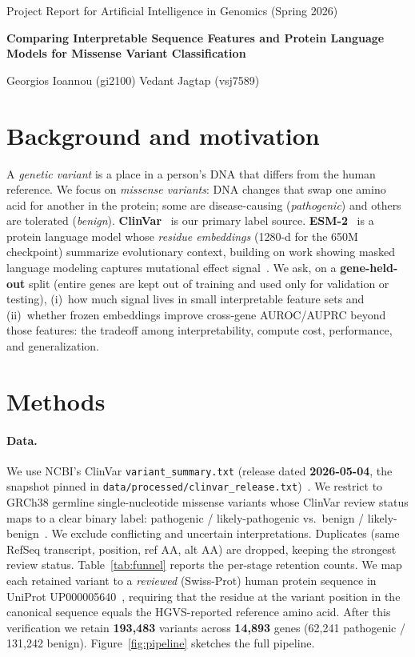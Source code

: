 \documentclass[11pt,letterpaper]{article}
\begin{document}
\noindent Project Report for Artificial Intelligence in Genomics (Spring 2026)

\begin{center}
{\LARGE\textbf{Comparing Interpretable Sequence Features and Protein Language Models for Missense Variant Classification}\par}
\vspace{0.5em}
Georgios Ioannou (gi2100) \quad Vedant Jagtap (vsj7589)
\end{center}
\vspace{-0.8em}

\section*{Background and motivation}
A \emph{genetic variant} is a place in a person's DNA that differs from the human reference. We focus on \emph{missense variants}: DNA changes that swap one amino acid for another in the protein; some are disease-causing (\emph{pathogenic}) and others are tolerated (\emph{benign}). \textbf{ClinVar}~\citep{landrum2020clinvar,ncbi2026intro} is our primary label source. \textbf{ESM-2}~\citep{rives2021biological,lin2023esm2} is a protein language model whose \emph{residue embeddings} (1280-d for the 650M checkpoint) summarize evolutionary context, building on work showing masked language modeling captures mutational effect signal~\citep{meier2021language}. We ask, on a \textbf{gene-held-out} split (entire genes are kept out of training and used only for validation or testing), (i)~how much signal lives in small interpretable feature sets and (ii)~whether frozen embeddings improve cross-gene AUROC/AUPRC beyond those features: the tradeoff among interpretability, compute cost, performance, and generalization.

\section*{Methods}

\paragraph{Data.}
We use NCBI's ClinVar \texttt{variant\_summary.txt} (release dated \textbf{2026-05-04}, the snapshot pinned in \texttt{data/processed/clinvar\_release.txt})~\citep{ncbi2026ftp}. We restrict to GRCh38 germline single-nucleotide missense variants whose ClinVar review status maps to a clear binary label: pathogenic / likely-pathogenic vs.\ benign / likely-benign~\citep{ncbi2026clinsig,ncbi2026reviewstatus}. We exclude conflicting and uncertain interpretations. Duplicates (same RefSeq transcript, position, ref AA, alt AA) are dropped, keeping the strongest review status. Table~\ref{tab:funnel} reports the per-stage retention counts. We map each retained variant to a \emph{reviewed} (Swiss-Prot) human protein sequence in UniProt UP000005640~\citep{uniprot2026proteome}, requiring that the residue at the variant position in the canonical sequence equals the HGVS-reported reference amino acid. After this verification we retain \textbf{193{,}483} variants across \textbf{14{,}893} genes (62{,}241 pathogenic / 131{,}242 benign). Figure~\ref{fig:pipeline} sketches the full pipeline.
\end{document}
